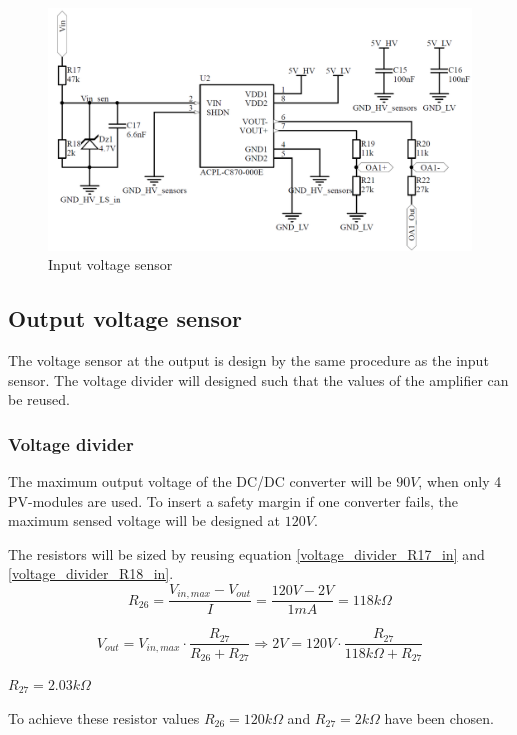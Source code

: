 \begin{figure}[H]
	\begin{center}
		\includegraphics[width=0.7\linewidth]{../Pictures/P1/Sensors/input_voltage_sensor.PNG}
		\caption{Input voltage sensor}
		\label{fig:input_voltage_sensor_circuit}
	\end{center}
\end{figure}

\subsection{Output voltage sensor}
The voltage sensor at the output is design by the same procedure as the input sensor. The voltage divider will designed such that the values of the amplifier can be reused.

\subsubsection{Voltage divider}
The maximum output voltage of the DC/DC converter will be $90V$, when only 4 PV-modules are used. To insert a safety margin if one converter fails, the maximum sensed voltage will be designed at $120V$.

The resistors will be sized by reusing equation \ref{voltage_divider_R17_in} and \ref{voltage_divider_R18_in}.
\begin{equation}
	R_{26} = \frac{V_{in,max}-V_{out}}{I} = \frac{120V-2V}{1mA} = 118k\Omega	
\end{equation}

\begin{equation} 
	V_{out} = V_{in,max} \cdot \frac{R_{27}}{R_{26}+R_{27}} \Rightarrow 2V = 120V \cdot \frac{R_{27}}{118k\Omega+R_{27}}
\end{equation}
\begin{center}
	$R_{27} = 2.03k\Omega$
\end{center}

To achieve these resistor values $R_{26} = 120k\Omega$ and $R_{27} = 2k\Omega$ have been chosen. 

